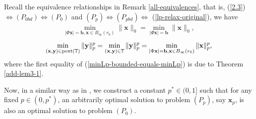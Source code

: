 \documentclass[12pt]{article}
\begin{document}
Recall the equivalence relationships in Remark \ref{all-equivalences}, that is,
{\rm (\ref{2.3})} $\Leftrightarrow(P_{0bd})\Leftrightarrow(P_{0})$ and $(P_{p})\Leftrightarrow(P_{pbd})\Leftrightarrow$ {\rm (\ref{lp-relax-original})},
we have
\begin{eqnarray}\label{minL0-bounded-equals-minL0}
\min\limits_{|\Phi\mathbf{x}|=\mathbf{b},\mathbf{x}\in B_{\infty}(r_0)}\|\mathbf{x}\|_{0}=\min\limits_{|\Phi\mathbf{x}|=\mathbf{b}}\|\mathbf{x}\|_{0},
\end{eqnarray}
\begin{eqnarray}\label{minLp-bounded-equals-minLp}
 \min\limits_{{(\mathbf{x},\mathbf{y})\in{\rm pext\left(\mathbb{T}\right)}}}\|\mathbf{y}\|^{p}_{p}=\min\limits_{(\mathbf{x},\mathbf{y})\in{\rm \mathbb{T}}}\|\mathbf{y}\|^{p}_{p}=\min\limits_{|\Phi\mathbf{x}|=\mathbf{b},\mathbf{x}\in B_{\infty}(r_0)}\|\mathbf{x}\|^{p}_{p},
\end{eqnarray}
where the first equality of (\ref{minLp-bounded-equals-minLp}) is due to Theorem \ref{add-lem3-1}.

Now, in a similar way as in \cite{peng15equivalence_Lp}, we construct a constant $p^\ast\in (0,1]$ such that for any fixed $p\in (0,p^\ast)$, an arbitrarily optimal solution to problem $(P_p)$, say ${\mathbf{x}}_p$, is also an optimal solution to problem $(P_0)$.
\end{document}
